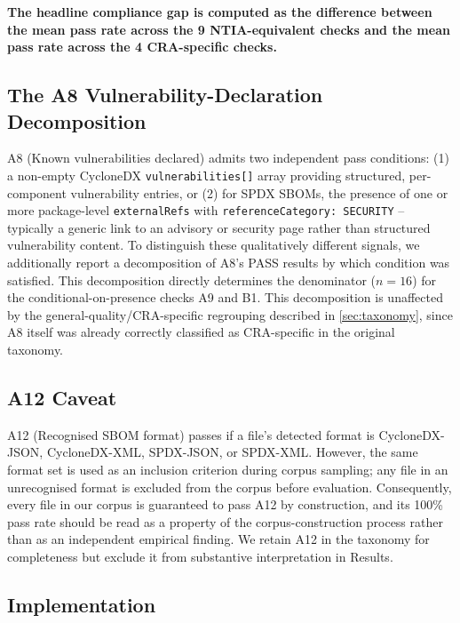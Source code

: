 \documentclass[11pt]{article}
\begin{document}
\textbf{The headline compliance gap is computed as the difference between the mean pass rate across the 9 NTIA-equivalent checks and the mean pass rate across the 4 CRA-specific checks.}

\subsection{The A8 Vulnerability-Declaration Decomposition}
\label{sec:a8-decomp-method}

A8 (Known vulnerabilities declared) admits two independent pass conditions: (1) a non-empty CycloneDX \texttt{vulnerabilities[]} array providing structured, per-component vulnerability entries, or (2) for SPDX SBOMs, the presence of one or more package-level \texttt{externalRefs} with \texttt{referenceCategory: SECURITY} -- typically a generic link to an advisory or security page rather than structured vulnerability content. To distinguish these qualitatively different signals, we additionally report a decomposition of A8's PASS results by which condition was satisfied. This decomposition directly determines the denominator ($n=16$) for the conditional-on-presence checks A9 and B1. This decomposition is unaffected by the general-quality/CRA-specific regrouping described in \cref{sec:taxonomy}, since A8 itself was already correctly classified as CRA-specific in the original taxonomy.

\subsection{A12 Caveat}
\label{sec:a12-caveat}

A12 (Recognised SBOM format) passes if a file's detected format is CycloneDX-JSON, CycloneDX-XML, SPDX-JSON, or SPDX-XML. However, the same format set is used as an inclusion criterion during corpus sampling; any file in an unrecognised format is excluded from the corpus before evaluation. Consequently, every file in our corpus is guaranteed to pass A12 by construction, and its 100\% pass rate should be read as a property of the corpus-construction process rather than as an independent empirical finding. We retain A12 in the taxonomy for completeness but exclude it from substantive interpretation in Results.

\subsection{Implementation}
\label{sec:implementation}
\end{document}
